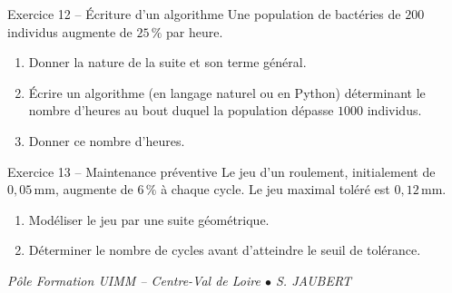 \documentclass[a4paper,11pt]{article}
\begin{document}
\begin{exo}{Exercice 12 -- Écriture d'un algorithme}
Une population de bactéries de $200$ individus augmente de $25\,\%$ par heure.
\begin{enumerate}[label=\alph*)]
  \item Donner la nature de la suite et son terme général.
  \item Écrire un algorithme (en langage naturel ou en Python) déterminant le nombre d'heures au bout duquel la population dépasse $1000$ individus.
  \item Donner ce nombre d'heures.
\end{enumerate}
\end{exo}

\begin{exo}{Exercice 13 -- Maintenance préventive}
Le jeu d'un roulement, initialement de $0{,}05\,$mm, augmente de $6\,\%$ à chaque cycle. Le jeu maximal toléré est $0{,}12\,$mm.
\begin{enumerate}[label=\alph*)]
  \item Modéliser le jeu par une suite géométrique.
  \item Déterminer le nombre de cycles avant d'atteindre le seuil de tolérance.
\end{enumerate}
\end{exo}

\vfill
\begin{center}\color{uimmgray}\small
\textit{Pôle Formation UIMM -- Centre-Val de Loire $\bullet$ S. JAUBERT}
\end{center}
\end{document}
